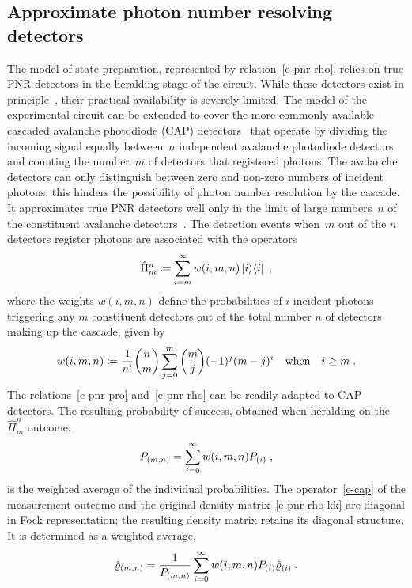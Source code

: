 \documentclass{article}
\begin{document}
\subsection*{Approximate photon number resolving detectors}

The model of state preparation, represented by relation~\eqref{e-pnr-rho}, relies on true PNR detectors in the heralding stage of the circuit. While these detectors exist in principle~\cite{hopker2019,endo2021,endo2024}, their practical availability is severely limited. The model of the experimental circuit can be extended to cover the more commonly available cascaded avalanche photodiode (CAP) detectors~\cite{hlousek2019,grygar2022,hlousek2024,ercolano2024} that operate by dividing the incoming signal equally between~$n$ independent avalanche photodiode detectors and counting the number~$m$ of detectors that registered photons. The avalanche detectors can only distinguish between zero and non-zero numbers of incident photons; this hinders the possibility of photon number resolution by the cascade. It approximates true PNR detectors well only in the limit of large numbers~$n$ of the constituent avalanche detectors~\cite{provaznik2020}. The detection events when~$m$ out of the $n$ detectors register photons are associated with the operators~\cite{paul1996}
%
\begin{equation}\label{e-cap}
  \hat{\Pi}_{m}^{n} 
    \coloneqq \sum_{i = m}^{\infty} w(i, m, n) \ketbra{i}{i} \Qc
\end{equation}
%
where the weights $w(i, m, n)$ define the probabilities of $i$ incident photons triggering any $m$ constituent detectors out of the total number $n$ of detectors making up the cascade, given by
%
\begin{equation}\label{e-cap-w}
  w(i, m, n) \coloneqq 
    \frac{1}{n^{i}} \binom{n}{m} \sum_{j = 0}^{m} \binom{m}{j} (-1)^{j} (m - j)^{i} 
    \quad\text{when}\quad i \geq m \;\text{.}
\end{equation} 
%
The relations~\eqref{e-pnr-pro} and~\eqref{e-pnr-rho} can be readily adapted to CAP detectors. The resulting probability of success, obtained when heralding on the~$\hat{\Pi}_{m}^{n}$ outcome, 
%
\begin{equation}\label{e-cap-pro}
  P_{(m, n)} = \sum_{i = 0}^{\infty} w(i, m, n) P_{(i)} \;\text{,}
\end{equation}
%
is the weighted average of the individual probabilities. The operator~\eqref{e-cap} of the measurement outcome and the original density matrix~\eqref{e-pnr-rho-kk} are diagonal in Fock representation; the resulting density matrix retains its diagonal structure. It is determined as a weighted average,
%
\begin{equation}\label{e-cap-rho-kk}
  \hat{\varrho}_{(m, n)} =
    \frac{1}{ P_{(m,n)} }
    \sum_{i = 0}^{\infty} w(i, m, n) P_{(i)} \hat{\varrho}_{(i)}
  \;\text{.}
\end{equation}
\end{document}
